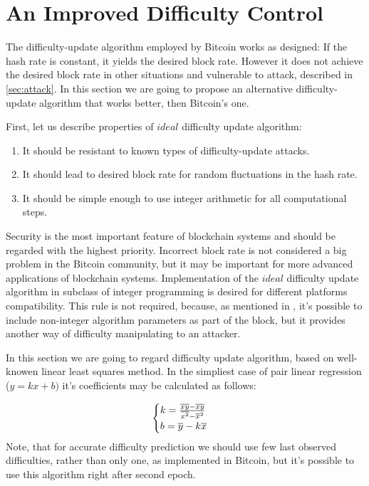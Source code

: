 \documentclass[number,preprint,review]{elsarticle}
\begin{document}
\section{An Improved Difficulty Control}
\label{sec:improved}

The difficulty-update algorithm employed by Bitcoin works as designed: If the hash rate is constant, it yields the desired block rate.
However it does not achieve the desired block rate in other situations and vulnerable to attack, described in \ref{sec:attack}.
In this section we are going to propose an alternative difficulty-update algorithm that works better, then Bitcoin's one.

First, let us describe properties of \(ideal\) difficulty update algorithm:
\begin{enumerate}
\item{It should be resistant to known types of difficulty-update attacks.}
\item{It should lead to desired block rate for random fluctuations in the hash rate.}
\item{It should be simple enough to use integer arithmetic for all computational steps.}
\end{enumerate}
Security is the most important feature of blockchain systems and should be regarded with the highest priority.
Incorrect block rate is not considered a big problem in the Bitcoin community, but it may be important for more advanced applications of blockchain systems.
Implementation of the \(ideal\) difficulty update algorithm in subclass of integer programming is desired for different platforms compatibility.
This rule is not required, because, as mentioned in \cite{kraft2015difficulty}, it's possible to include non-integer algorithm parameters as part of the block, but it provides another way of difficulty manipulating to an attacker.

In this section we are going to regard difficulty update algorithm, based on well-knowen linear least squares method\cite{lawson1974solving}.
In the simpliest case of pair linear regression (\(y=kx+b)\) it's coefficients may be calculated as follows:

\begin{equation}
  \begin{cases}
    k= {{\overline{xy} - \overline{x}\overline{y}} \over {\overline{x^2} - \overline{x}^2}}  \\
    b=\overline{y}-k\overline{x}
  \end{cases}
\end{equation}
Note, that for accurate difficulty prediction we should use few last observed difficulties, rather than only one, as implemented in Bitcoin, but it's possible to use this algorithm right after second epoch.
\end{document}
